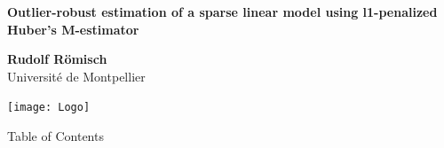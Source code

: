\documentclass[unknownkeysallowed]{beamer}
\begin{document}



\begin{frame}
\bigskip
\bigskip
\begin{center}{
\LARGE\color{marron}
\textbf{Outlier-robust estimation of a sparse linear model using l1-penalized Huber's M-estimator}
\textbf{ }\\
\vspace{0.5cm}
}

\color{marron}
\textbf{}
\end{center}

\vspace{0.5cm}

\begin{center}
\textbf{Rudolf Römisch} \\
\vspace{0.5cm}
Université de Montpellier \\
\end{center}

\centering
\texttt{[image: Logo]}

\end{frame}






\begin{frame}{Table of Contents}
\tableofcontents[hideallsubsections]
\end{frame}



\end{document}
